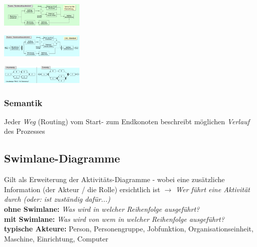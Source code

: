 \documentclass{report}
\newenvironment{Figure}
	{\par\medskip\noindent\minipage{\linewidth}}
	{\endminipage\par\medskip}
\theoremstyle{definition}
\theoremstyle{example}
\begin{document}
\begin{Figure}
\centering
\includegraphics[width=150px]{img/AkDiaVereinfacht.png}
	\label{fig:Vereinfachte Darstellung eines Aktivitätsdigramm für den Kundenauftrag abwickeln}
\end{Figure}

\begin{Figure}
\centering
\includegraphics[width=150px]{img/AkDiaUML.png}
	\label{fig:UML Darstellung eines Aktivitätsdigramm für den Kundenauftrag abwickeln}
\end{Figure}

\begin{Figure}
\centering
\includegraphics[width=150px]{img/AkDiaDoDonts.png}
	\label{fig:un- bzw zulässig eines Aktivitätsdigramm}
\end{Figure}

      \subsubsection{Semantik}
Jeder \textit{Weg} (Routing) vom Start- zum Endkonoten beschreibt möglichen \textit{Verlauf} des Prozesses


   \subsection{Swimlane-Diagramme}
Gilt als Erweiterung der Aktivitäts-Diagramme - wobei eine zusätzliche Information (der Akteur / die Rolle) ersichtlich ist $\rightarrow$ \textit{Wer führt eine Aktivität durch (oder: ist zuständig dafür...)}\\
\textbf{ohne Swimlane:} \textit{Was wird in welcher Reihenfolge ausgeführt?}\\
\textbf{mit Swimlane:} \textit{Was wird von wem in welcher Reihenfolge ausgeführt?}\\
\textbf{typische Akteure:} Person, Personengruppe, Jobfunktion, Organisationseinheit, Maschine, Einrichtung, Computer
\end{document}
